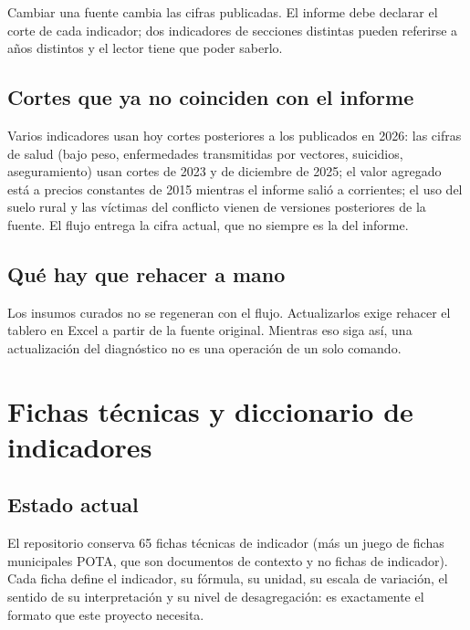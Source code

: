 \documentclass[11pt,a4paper]{article}
\begin{document}
\begin{regla}[title={Regla 7 — actualizar es cambiar de corte, y hay que decirlo}]
Cambiar una fuente cambia las cifras publicadas. El informe debe declarar el
corte de cada indicador; dos indicadores de secciones distintas pueden referirse
a años distintos y el lector tiene que poder saberlo.
\end{regla}

\subsection{Cortes que ya no coinciden con el informe}

Varios indicadores usan hoy cortes posteriores a los publicados en 2026: las
cifras de salud (bajo peso, enfermedades transmitidas por vectores, suicidios,
aseguramiento) usan cortes de 2023 y de diciembre de 2025; el valor agregado
está a precios constantes de 2015 mientras el informe salió a corrientes; el uso
del suelo rural y las víctimas del conflicto vienen de versiones posteriores de
la fuente. El flujo entrega la cifra actual, que no siempre es la del informe.

\subsection{Qué hay que rehacer a mano}

Los \cifraCurados{} insumos curados no se regeneran con el flujo. Actualizarlos
exige rehacer el tablero en Excel a partir de la fuente original. Mientras eso
siga así, una actualización del diagnóstico no es una operación de un solo
comando.

\section{Fichas técnicas y diccionario de indicadores}

\subsection{Estado actual}

El repositorio conserva 65 fichas técnicas de indicador (más un juego de fichas
municipales POTA, que son documentos de contexto y no fichas de indicador). Cada
ficha define el indicador, su fórmula, su unidad, su escala de variación, el
sentido de su interpretación y su nivel de desagregación: es exactamente el
formato que este proyecto necesita.
\end{document}
